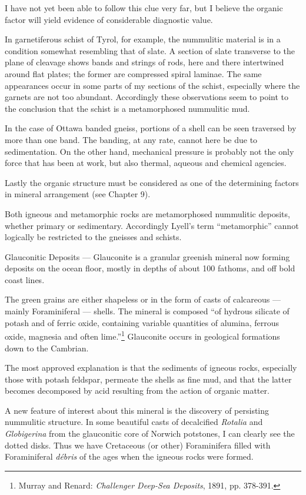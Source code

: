 \documentclass[a4paper, 12pt, oneside]{article}
\begin{document}
I have not yet been able to follow this clue very far, but I believe the organic factor will yield evidence of considerable diagnostic value.

In garnetiferous schist of Tyrol, for example, the nummulitic material is in a condition somewhat resembling that of slate. A section of slate transverse to the plane of cleavage shows bands and strings of rods, here and there intertwined around flat plates; the former are compressed spiral laminae. The same appearances occur in some parts of my sections of the schist, especially where the garnets are not too abundant. Accordingly these observations seem to point to the conclusion that the schist is a metamorphosed nummulitic mud.

In the case of Ottawa banded gneiss, portions of a shell can be seen traversed by more than one band. The banding, at any rate, cannot here be due to sedimentation. On the other hand, mechanical pressure is probably not the only force that has been at work, but also thermal, aqueous and chemical agencies.

Lastly the organic structure must be considered as one of the determining factors in mineral arrangement (see Chapter 9).

Both igneous and metamorphic rocks are metamorphosed nummulitic deposits, whether primary or sedimentary. Accordingly Lyell's term ``metamorphic'' cannot logically be restricted to the gneisses and schists.

Glauconitic Deposits --- Glauconite is a granular greenish mineral now forming deposits on the ocean floor, mostly in depths of about 100 fathoms, and off bold coast lines.

The green grains are either shapeless or in the form of casts of calcareous --- mainly Foraminiferal --- shells. The mineral is composed ``of hydrous silicate of potash and of ferric oxide, containing variable quantities of alumina, ferrous oxide, magnesia and often lime.''\footnote{Murray and Renard: \emph{Challenger Deep-Sea Deposits}, 1891, pp. 378-391.} Glauconite occurs in geological formations down to the Cambrian.

The most approved explanation is that the sediments of igneous rocks, especially those with potash feldspar, permeate the shells as fine mud, and that the latter becomes decomposed by acid resulting from the action of organic matter.

A new feature of interest about this mineral is the discovery of persisting nummulitic structure. In some beautiful casts of decalcified \emph{Rotalia} and \emph{Globigerina} from the glauconitic core of Norwich potstones, I can clearly see the dotted disks. Thus we have Cretaceous (or other) Foraminifera filled with Foraminiferal \emph{débris} of the ages when the igneous rocks were formed.
\end{document}
